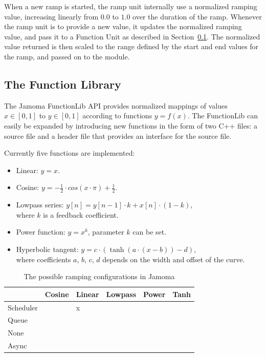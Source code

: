 \documentclass{article}
\begin{document}
When a new ramp is started, the ramp unit internally use a normalized ramping value, increasing linearly from $0.0$ to $1.0$ over the duration of the ramp. Whenever the ramp unit is to provide a new value, it updates the normalized ramping value, and pass it to a Function Unit as described in Section~\ref{sec:functionlib}. The normalized value returned is then scaled to the range defined by the start and end values for the ramp, and passed on to the module.




\subsection{The Function Library} %
\label{sec:functionlib}
The Jamoma FunctionLib API provides normalized mappings of values $x \in [0,1]$ to $y \in [0,1]$ according to functions $y = f(x)$. The FunctionLib can easily be expanded by introducing new functions in the form of two C++ files: a source file and a header file that provides an interface for the source file.

Currently five functions are implemented: 

\begin{itemize}
	\item Linear: $y = x$.
	\item Cosine: $y = - \frac{1}{2} \cdot cos(x \cdot \pi ) + \frac{1}{2} $.
	\item Lowpass series: $y[n] = y[n-1] \cdot k + x[n] \cdot (1-k)$, \\ where $k$ is a feedback coefficient.
	\item Power function: $ y = x^{k} $, parameter $k$ can be set.
	\item Hyperbolic tangent: $ y = c \cdot (\tanh(a\cdot(x-b)) - d) $, \\ where coefficients $a$, $b$, $c$, $d$ depends on the width and offset of the curve.
\end{itemize}



\begin{table}
\begin{center}
\footnotesize\noindent
\begin{tabular}{|l|l|l|l|l|l|}
\hline
          & Cosine & Linear & Lowpass & Power & Tanh \\
\hline
Scheduler &        &   x    &         &       & \\
\hline
Queue	  &        &        &         &       & \\
\hline
None	  &        &        &         &       & \\
\hline
Async	  &        &        &         &       & \\
\hline
\end{tabular}
\end{center}
\caption{The possible ramping configurations in Jamoma}
\label{tab:ramp_possibilities} %
\end{table}
\end{document}
